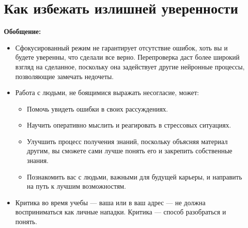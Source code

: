 \documentclass{article}
\begin{document}
\section{Как избежать излишней уверенности}
\textbf{Обобщение:}
\begin{itemize}
\item Сфокусированный режим не гарантирует отсутствие ошибок, хоть вы и будете уверенны, что сделали все верно. Перепроверка даст более широкий взгляд на сделанное, поскольку она задействует другие нейронные процессы, позволяющие замечать недочеты.
\item Работа с людьми, не боящимися выражать несогласие, может:
\begin{itemize}
\item Помочь увидеть ошибки в своих рассуждениях.
\item Научить оперативно мыслить и реагировать в стрессовых ситуациях.
\item Улучшить процесс получения знаний, поскольку объясняя материал другим, вы сможете сами лучше понять его и закрепить собственные знания.
\item Познакомить вас с людьми, важными для будущей карьеры, и направить на путь к лучшим возможностям.
\end{itemize}
\item Критика во время учебы --- ваша или в ваш адрес --- не должна восприниматься как личные нападки. Критика --- способ разобраться и понять.
\end{itemize}
\end{document}
